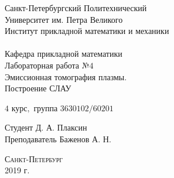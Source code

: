 \documentclass[a4]{article}
\begin{document}
\def\contentsname{\LARGE{Содержание}}
\thispagestyle{empty}
\begin{center} 
\vspace{2cm} 
{\Large \sc Санкт-Петербургский Политехнический}\\
\vspace{2mm}
{\Large \sc Университет} им. {\Large\sc Петра Великого}\\
\vspace{1cm}
{\large \sc Институт прикладной математики и механики\\ 
\vspace{0.5mm}
\textsc{}}\\ 
\vspace{0.5mm}
{\large\sc Кафедра прикладной математики}\\
\vspace{15mm}
{\huge \sc Лабораторная работа №$4$\\
\vspace{4mm}
Эмиссионная томография плазмы.\\
\vspace{4mm}
Построение СЛАУ
\vspace{6mm}
 }
\vspace*{2mm}
\vspace{1cm}

{\sc $4$ курс$,$ группа $3630102/60201$}

\vspace{2cm} 
Студент \hfill Д. А. Плаксин\\
\vspace{1cm}
Преподаватель \hfill Баженов А. Н.\\
\vspace{20mm} 

\end{center} 
\begin{center}
\vfill {\large\textsc{Санкт-Петербург}}\\ 
2019 г.
\end{center}

\end{document}
